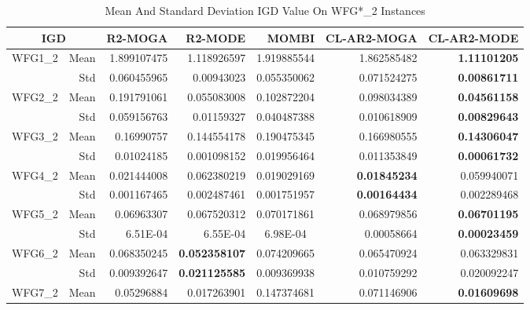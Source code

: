 \begin{table*}[htbp]
  \centering
  \caption{Mean And Standard Deviation IGD Value On WFG*\_2 Instances}
    \begin{tabular}{rrrrrrr}
    \toprule
    \multicolumn{2}{c}{IGD} & R2-MOGA & R2-MODE & MOMBI & CL-AR2-MOGA & CL-AR2-MODE \\
    \midrule
    \multirow{2}[0]{*}{WFG1\_2} & Mean  & 1.899107475 & 1.118926597 & \multicolumn{1}{c}{1.919885544} & 1.862585482 & \textbf{1.11101205} \\
          & Std   & 0.060455965 & 0.00943023 & \multicolumn{1}{c}{0.055350062} & 0.071524275 & \textbf{0.00861711} \\
    \multirow{2}[0]{*}{WFG2\_2} & Mean  & 0.191791061 & 0.055083008 & \multicolumn{1}{c}{0.102872204} & 0.098034389 & \textbf{0.04561158} \\
          & Std   & 0.059156763 & 0.01159327 & \multicolumn{1}{c}{0.040487388} & 0.010618909 & \textbf{0.00829643} \\
    \multirow{2}[0]{*}{WFG3\_2} & Mean  & 0.16990757 & 0.144554178 & \multicolumn{1}{c}{0.190475345} & 0.166980555 & \textbf{0.14306047} \\
          & Std   & 0.01024185 & 0.001098152 & \multicolumn{1}{c}{0.019956464} & 0.011353849 & \textbf{0.00061732} \\
    \multirow{2}[0]{*}{WFG4\_2} & Mean  & 0.021444008 & 0.062380219 & \multicolumn{1}{c}{0.019029169} & \textbf{0.01845234} & 0.059940071 \\
          & Std   & 0.001167465 & 0.002487461 & \multicolumn{1}{c}{0.001751957} & \textbf{0.00164434} & 0.002289468 \\
    \multirow{2}[0]{*}{WFG5\_2} & Mean  & 0.06963307 & 0.067520312 & \multicolumn{1}{c}{0.070171861} & 0.068979856 & \textbf{0.06701195} \\
          & Std   & 6.51E-04 & 6.55E-04 & \multicolumn{1}{c}{6.98E-04} & 0.00058664 & \textbf{0.00023459} \\
    \multirow{2}[0]{*}{WFG6\_2} & Mean  & 0.068350245 & \textbf{0.052358107} & \multicolumn{1}{c}{0.074209665} & 0.065470924 & 0.063329831 \\
          & Std   & 0.009392647 & \textbf{0.021125585} & \multicolumn{1}{c}{0.009369938} & 0.010759292 & 0.020092247 \\
    \multirow{2}[0]{*}{WFG7\_2} & Mean  & 0.05296884 & 0.017263901 & \multicolumn{1}{c}{0.147374681} & 0.071146906 & \textbf{0.01609698} \\

\end{tabular}
\end{table*}
